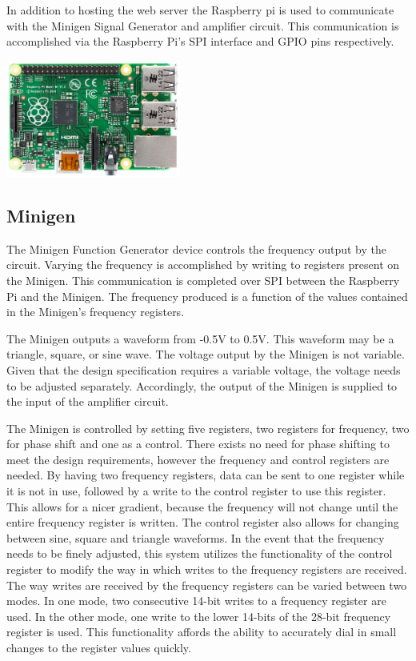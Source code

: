 \documentclass{article}	%
\begin{document}
\begin{multicols}{2}
In addition to hosting the web server the Raspberry pi is used to
communicate with the 
Minigen Signal Generator and 
amplifier circuit.
This communication is accomplished via 
the Raspberry Pi's SPI interface and
GPIO pins respectively.


\begin{center}
\includegraphics[width=0.43\textwidth,keepaspectratio]{rpi_real.png}
\end{center}

\subsection{Minigen}
The Minigen Function Generator device controls the frequency output by the circuit.
Varying the frequency is accomplished 
by writing to registers present on the Minigen.
This communication is completed over SPI between
the Raspberry Pi and the Minigen.
The frequency produced is a function of
the values contained in the Minigen's frequency registers.

The Minigen outputs a waveform 
from -0.5V to 0.5V. 
This waveform may be a triangle, square, or sine wave.
The voltage output by the Minigen is not variable.
Given that the design specification requires a variable voltage,
the voltage needs to be adjusted separately.
Accordingly, the output of the Minigen 
is supplied to the input of the amplifier circuit.

The Minigen is controlled by setting five registers,
two registers for frequency, 
two for phase shift and 
one as a control. 
There exists no need for phase shifting
to meet the design requirements, 
however the frequency and control registers
are needed. 
By having two frequency registers,
data can be sent to one register while it is not in use,
followed by a write to the control register to use this register.
This allows for a nicer gradient, 
because the frequency will not change until the entire frequency register is written. 
The control register also allows for changing between sine, square and triangle waveforms.
In the event that the frequency needs to be finely adjusted,
this system utilizes the functionality of the control register
to modify the way in which writes to the frequency registers are received.
The way writes are received by the frequency registers 
can be varied between two modes.
In one mode,
two consecutive 14-bit writes to a frequency register are used.
In the other mode,
one write to the lower 14-bits of the 28-bit frequency register is used.
This functionality affords the ability to accurately dial in small changes to the register values quickly.


\end{multicols}
\end{document}
